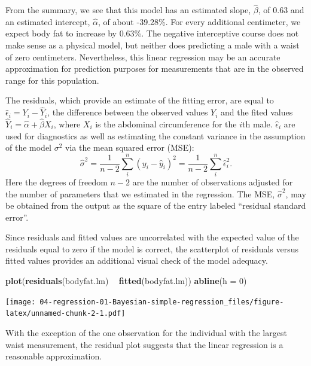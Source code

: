 \documentclass[]{book}
\newenvironment{Shaded}{\begin{snugshade}}{\end{snugshade}}
\newcommand{\KeywordTok}[1]{\textcolor[rgb]{0.13,0.29,0.53}{\textbf{#1}}}
\newcommand{\DataTypeTok}[1]{\textcolor[rgb]{0.13,0.29,0.53}{#1}}
\newcommand{\DecValTok}[1]{\textcolor[rgb]{0.00,0.00,0.81}{#1}}
\newcommand{\StringTok}[1]{\textcolor[rgb]{0.31,0.60,0.02}{#1}}
\newcommand{\OperatorTok}[1]{\textcolor[rgb]{0.81,0.36,0.00}{\textbf{#1}}}
\newcommand{\NormalTok}[1]{#1}
\theoremstyle{definition}
\theoremstyle{definition}
\theoremstyle{definition}
\theoremstyle{remark}
\begin{document}
From the summary, we see that this model has an estimated slope,
\(\hat{\beta}\), of 0.63 and an estimated intercept, \(\hat{\alpha}\),
of about -39.28\%. For every additional centimeter, we expect body fat
to increase by 0.63\%. The negative interceptive course does not make
sense as a physical model, but neither does predicting a male with a
waist of zero centimeters. Nevertheless, this linear regression may be
an accurate approximation for prediction purposes for measurements that
are in the observed range for this population.

The residuals, which provide an estimate of the fitting error, are equal
to \(\hat{\epsilon}_i = Y_i - \hat{Y}_i\), the difference between the
observed values \(Y_i\) and the fited values
\(\hat{Y}_i = \hat{\alpha} + \hat{\beta}X_i\), where \(X_i\) is the
abdominal circumference for the \(i\)th male. \(\hat{\epsilon}_i\) are
used for diagnostics as well as estimating the constant variance in the
assumption of the model \(\sigma^2\) via the mean squared error (MSE):
\[ \hat{\sigma}^2 = \frac{1}{n-2}\sum_i^n (y_i-\hat{y}_i)^2 = \frac{1}{n-2}\sum_i^n \hat{\epsilon}_i^2. \]
Here the degrees of freedom \(n-2\) are the number of observations
adjusted for the number of parameters that we estimated in the
regression. The MSE, \(\hat{\sigma}^2\), may be obtained from the output
as the square of the entry labeled ``residual standard error''.

Since residuals and fitted values are uncorrelated with the expected
value of the residuals equal to zero if the model is correct, the
scatterplot of residuals versus fitted values provides an additional
visual check of the model adequacy.

\begin{Shaded}
\begin{Highlighting}[]
\KeywordTok{plot}\NormalTok{(}\KeywordTok{residuals}\NormalTok{(bodyfat.lm) }\OperatorTok{~}\StringTok{ }\KeywordTok{fitted}\NormalTok{(bodyfat.lm))}
\KeywordTok{abline}\NormalTok{(}\DataTypeTok{h =} \DecValTok{0}\NormalTok{)}
\end{Highlighting}
\end{Shaded}

\texttt{[image: 04-regression-01-Bayesian-simple-regression\_files/figure-latex/unnamed-chunk-2-1.pdf]}

With the exception of the one observation for the individual with the
largest waist measurement, the residual plot suggests that the linear
regression is a reasonable approximation.
\end{document}
